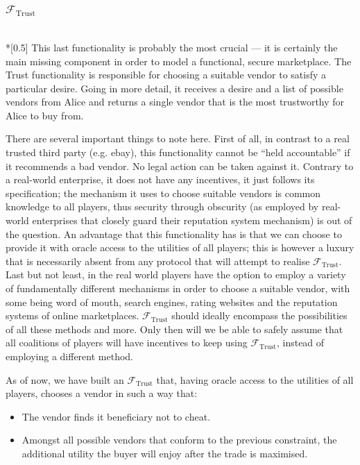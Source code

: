 \subsubsection{$\mathcal{F}_{\mathrm{Trust}}$} \ \\*[0.5\baselineskip]
  This last functionality is probably the most crucial --- it is certainly the main
  missing component in order to model a functional, secure marketplace. The Trust
  functionality is responsible for choosing a suitable vendor to satisfy a particular
  desire. Going in more detail, it receives a desire and a list of possible vendors from
  Alice and returns a single vendor that is the most trustworthy for Alice to buy from.

  There are several important things to note here. First of all, in contrast to a real
  trusted third party (e.g. ebay), this functionality cannot be ``held accountable'' if it
  recommends a bad vendor. No legal action can be taken against it. Contrary to a
  real-world enterprise, it does not have any incentives, it just follows its
  specification; the mechanism it uses to choose suitable vendors is common knowledge to
  all players, thus security through obscurity (as employed by real-world enterprises that
  closely guard their reputation system mechanism) is out of the question. An advantage
  that this functionality has is that we can choose to provide it with oracle access to
  the utilities of all players; this is however a luxury that is necessarily absent from
  any protocol that will attempt to realise $\mathcal{F}_{\mathrm{Trust}}$. Last but not
  least, in the real world players have the option to employ a variety of fundamentally
  different mechanisms in order to choose a suitable vendor, with some being word of
  mouth, search engines, rating websites and the reputation systems of online
  marketplaces. $\mathcal{F}_{\mathrm{Trust}}$ should ideally encompass the possibilities
  of all these methods and more. Only then will we be able to safely assume that all
  coalitions of players will have incentives to keep using $\mathcal{F}_{\mathrm{Trust}}$,
  instead of employing a different method.

  As of now, we have built an $\mathcal{F}_{\mathrm{Trust}}$ that, having oracle access to
  the utilities of all players, chooses a vendor in such a way that:
  \begin{itemize}
    \item The vendor finds it beneficiary not to cheat.
    \item Amongst all possible vendors that conform to the previous constraint, the
    additional utility the buyer will enjoy after the trade is maximised.
  \end{itemize}
